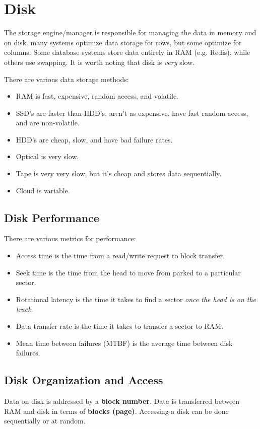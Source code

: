 \documentclass{report}
\renewcommand{\bf}[1]{\textbf{{#1}}}
\renewcommand{\it}[1]{\textit{{#1}}}
\begin{document}
\section{Disk}
The storage engine/manager is responsible for managing the data in memory and on
disk. many systems optimize data storage for rows, but some optimize for
columns. Some database systems store data entirely in RAM (e.g. Redis), while
others use swapping. It is worth noting that disk is \it{very} slow.

There are various data storage methods:
\begin{itemize}[label=$\to$]
    \item RAM is fast, expensive, random access, and volatile.
    \item SSD's are faster than HDD's, aren't as expensive, have fast random
        access, and are non-volatile.
    \item HDD's are cheap, slow, and have bad failure rates.
    \item Optical is very slow.
    \item Tape is very very slow, but it's cheap and stores data sequentially.
    \item Cloud is variable.
\end{itemize}

\subsection{Disk Performance}
There are various metrics for performance:
\begin{itemize}[label=$\to$]
    \item Access time is the time from a read/write request to block transfer.
    \item Seek time is the time from the head to move from parked to a
        particular sector.
    \item Rotational latency is the time it takes to find a sector
        \it{once the head is on the track}.
    \item Data transfer rate is the time it takes to transfer a sector to RAM.
    \item Mean time between failures (MTBF) is the average time between disk failures.
\end{itemize}

\subsection{Disk Organization and Access}
Data on disk is addressed by a \bf{block number}. Data is transferred between
RAM and disk in terms of \bf{blocks (page)}. Accessing a disk can be done
sequentially or at random.
\end{document}
